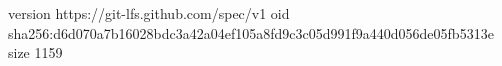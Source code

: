 version https://git-lfs.github.com/spec/v1
oid sha256:d6d070a7b16028bdc3a42a04ef105a8fd9c3c05d991f9a440d056de05fb5313e
size 1159
